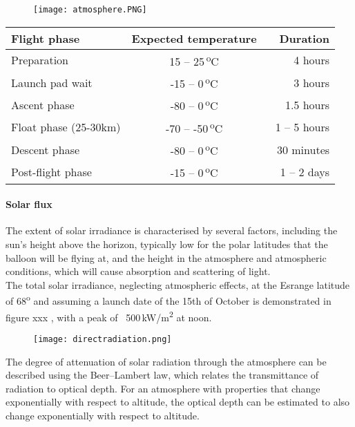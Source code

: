 	\begin{figure}[h!]
    \centering
    \texttt{[image: atmosphere.PNG]}
	\label{fig: atmosphere}
	\end{figure}
	
\begin{center}
  \begin{tabular}{ | l | c | r | }
    \hline
    \textbf{Flight phase} & \textbf{Expected temperature} & \textbf{Duration} \\ \hline
    Preparation  & 15 – 25\,\textsuperscript{o}C & 4 hours \\ \hline
    Launch pad wait & -15 – 0\,\textsuperscript{o}C & 3 hours \\ \hline
    Ascent phase  & -80 – 0\,\textsuperscript{o}C & 1.5 hours \\ \hline
    Float phase (25-30km) & -70 – -50\,\textsuperscript{o}C & 1 – 5 hours \\ \hline 
    Descent phase  & -80 – 0\,\textsuperscript{o}C & ~ 30 minutes \\ \hline
    Post-flight phase & -15 – 0\,\textsuperscript{o}C & 1 – 2 days \\ \hline
  \end{tabular}
\end{center}

\paragraph{Solar flux}

The extent of solar irradiance is characterised by several factors, including the sun’s height above the horizon, typically low for the polar latitudes that the balloon will be flying at, and the height in the atmosphere and atmospheric conditions, which will cause absorption and scattering of light. \\
The total solar irradiance, neglecting atmospheric effects, at the Esrange latitude of 68\textsuperscript{o} and assuming a launch date of the 15th of October is demonstrated in figure xxx , with a peak of ~500\,kW/m\textsuperscript{2} at noon.\\

	\begin{figure}[h!]
    \centering
    \texttt{[image: directradiation.png]}
	\label{fig: directradiation}
	\end{figure}

The degree of attenuation of solar radiation through the atmosphere can be described using the Beer–Lambert law, which relates the transmittance of radiation to optical depth. For an atmosphere with properties that change exponentially with respect to altitude, the optical depth can be estimated to also change exponentially with respect to altitude. \


